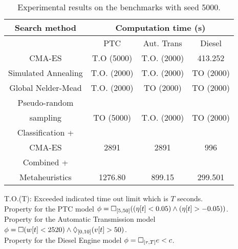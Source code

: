 \begin{table}[ht]
\caption{Experimental results on the benchmarks with seed 5000.}
\label{tab:results}
\begin{center}
\begin{tabular}{|c|c|c|c|}
\hline
\multirow{1}{*}{Search method} & \multicolumn{3}{|c|}{Computation time (s)} \\
\hline
\cline{2-4}
 &  PTC & Aut. Trans & Diesel    \\
\hline
\cline{2-4}
 CMA-ES & T.O (5000)  & T.O. (2000)  &  413.252  \\
\hline
\cline{2-4}
 Simulated Annealing &  T.O. (2000) & T.O. (2000)  & TO (2000)     \\
\hline
\cline{2-4}
Global Nelder-Mead &  T.O. (2000) &  TO (2000)  &  TO (2000)    \\
\hline
\cline{2-4}
Pseudo-random & & & \\ 
sampling &  TO (5000)  &  T.O. (2000) & TO (2000)    \\
\hline
\cline{2-4}
Classification + & & & \\ 
CMA-ES  \cite{CAV2017} & 2891  & 2891  & 996    \\
\hline
\cline{2-4}
 Combined + & & & \\ 
 Metaheuristics & 1276.80 &  899.15 & 299.501   \\
\hline
\end{tabular}
\end{center}
{\small T.O.(T): Exceeded indicated time out limit which is $T$ seconds.\\
Property for the PTC model $\phi = \Box_{[5,50]}( (\eta[t] < 0.05) \land ( \eta[t] > - 0.05 ))$. \\
Property for the Automatic Transmission model $\phi =  \Box(w[t] < 2520) \land  \Diamond_{[0,10]}(v[t] > 50)$. \\
Property for the Diesel Engine model $\phi=\Box_{[\tau,T]}e<c$.  
}
\end{table}



